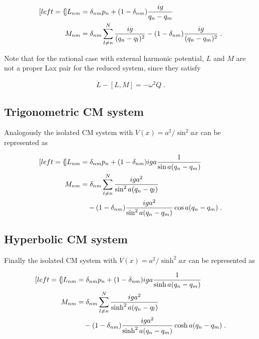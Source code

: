 \begin{subequations}
\begin{align}[left=\empheqlbrace]
L_{nm} &= \delta_{nm} p_n + (1 - \delta_{nm}) \frac{ig}{q_n - q_m} \\
M_{nm} &= \delta_{nm} \sum_{l \neq n}^N \frac{ig}{(q_n - q_l)^2} - (1-\delta_{nm}) \frac{ig}{(q_n - q_m)^2}\;.
\end{align}
\end{subequations}

\begin{obs}
    Note that for the rational case with external harmonic potential, $L$ and $M$ are not a proper Lax pair for the reduced system, since they satisfy
    
    \begin{equation}
        \dot L - [L,M] = - \omega^2 Q \;.
    \end{equation}
\end{obs}

\subsection{Trigonometric CM system}
Analogously the isolated CM system with $V(x) = {a^2}/{\sin^2{ax}}$ can be represented as

\begin{subequations}
\begin{align}[left=\empheqlbrace]
L_{nm} &= \delta_{nm} p_n + (1 - \delta_{nm}) iga\frac{1}{\sin{a(q_n - q_m)}} \\
M_{nm} &= \delta_{nm} \sum_{l \neq n}^N \frac{iga^2}{\sin^2{a(q_n - q_l)}} \nonumber\\ &\quad - (1-\delta_{nm}) \frac{iga^2}{\sin^2{a(q_n - q_m)}} \cos{a(q_n - q_m)}\;.
\end{align}
\end{subequations}

\subsection{Hyperbolic CM system}
Finally the isolated CM system with $V(x) = {a^2}/{\sinh^2{ax}}$ can be represented as

\begin{subequations}
\begin{align}[left=\empheqlbrace]
L_{nm} &= \delta_{nm} p_n + (1 - \delta_{nm}) iga\frac{1}{\sinh{a(q_n - q_m)}} \\
M_{nm} &= \delta_{nm} \sum_{l \neq n}^N \frac{iga^2}{\sinh^2{a(q_n - q_l)}} \nonumber\\ &\quad - (1-\delta_{nm}) \frac{iga^2}{\sinh^2{a(q_n - q_m)}} \cosh{a(q_n - q_m)}\;.
\end{align}
\end{subequations}

